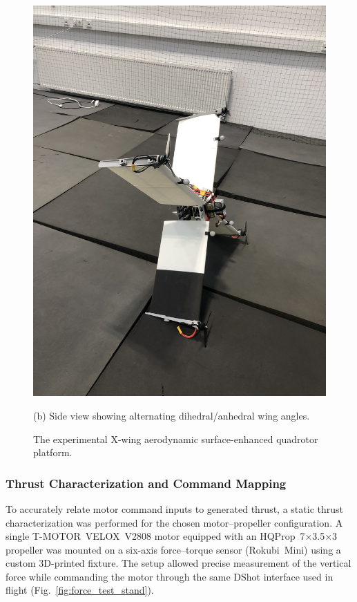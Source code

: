 \begin{figure}[htbp]
\begin{minipage}[b]{0.48\textwidth}
    \includegraphics[width=\textwidth,angle=-90]{figures/drone_wing_flight.jpg}
    \caption*{(b) Side view showing alternating dihedral/anhedral wing angles.}
\end{minipage}
\caption{The experimental X-wing aerodynamic surface-enhanced quadrotor platform.}
\label{fig:xwing_platform}
\end{figure}

\subsubsection{Thrust Characterization and Command Mapping}
To accurately relate motor command inputs to generated thrust, a static thrust characterization was performed for the chosen motor–propeller configuration.  
A single T-MOTOR~VELOX~V2808 motor equipped with an HQProp~7×3.5×3 propeller was mounted on a six-axis force–torque sensor (Rokubi~Mini) using a custom 3D-printed fixture.  
The setup allowed precise measurement of the vertical force while commanding the motor through the same DShot interface used in flight (Fig.~\ref{fig:force_test_stand}).

